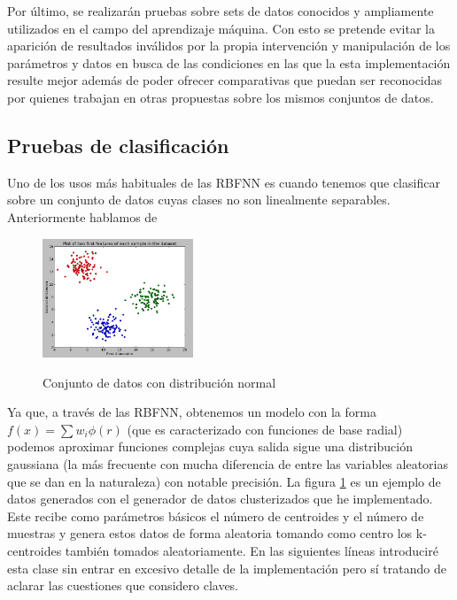 \documentclass[10pt,a4paper]{report}
\begin{document}
Por último, se realizarán pruebas sobre sets de datos conocidos y ampliamente utilizados en el campo del aprendizaje máquina. Con esto se pretende evitar la aparición de resultados inválidos por la propia intervención y manipulación de los parámetros y datos en busca de las condiciones en las que la esta implementación resulte mejor además de poder ofrecer comparativas que puedan ser reconocidas por quienes trabajan en otras propuestas sobre los mismos conjuntos de datos.

\subsection{Pruebas de clasificación}
Uno de los usos más habituales de las RBFNN es cuando tenemos que clasificar sobre un conjunto de datos cuyas clases no son linealmente separables. Anteriormente hablamos de
\begin{figure}[!h]{}
    \centering
    \includegraphics[width=0.4\textwidth]{img/clusteredData1.png}
    \label{fig:clusteredData1}
    \caption{Conjunto de datos con distribución normal}
\end{figure}
Ya que, a través de las RBFNN, obtenemos un modelo con la forma $f(x)=\sum w_{i}\phi(r)$ (que es caracterizado con funciones de base radial) podemos aproximar funciones complejas cuya salida sigue una distribución gaussiana (la más frecuente con mucha diferencia de entre las variables aleatorias que se dan en la naturaleza) con notable precisión. 
La figura \ref{fig:clusteredData1} es un ejemplo de datos generados con el generador de datos clusterizados que he implementado. Este recibe como parámetros básicos el número de centroides y el número de muestras y genera estos datos de forma aleatoria tomando como centro los k-centroides también tomados aleatoriamente. En las siguientes líneas introduciré esta clase sin entrar en excesivo detalle de la implementación pero sí tratando de aclarar las cuestiones que considero claves.
\end{document}
